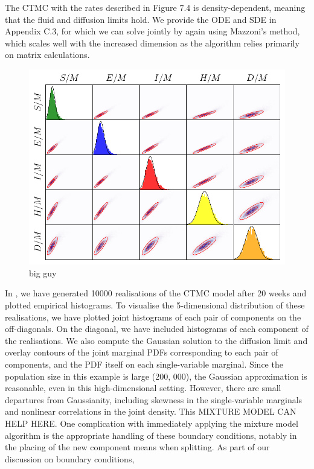 The CTMC with the rates described in Figure 7.4 is density-dependent, meaning that the fluid and diffusion limits hold. We provide the ODE and SDE in Appendix C.3, for which we can solve jointly by again using Mazzoni’s method, which scales well with the increased dimension as the algorithm relies primarily on matrix calculations.

\begin{landscape}
	\begin{figure}
		\centering
		\includegraphics[width=\textheight]{chp06_applications/figures/seihfr/seihfr_marginals_gaussian}
		\caption{big guy}
		\label{fig:ebola_marginals}
	\end{figure}
\end{landscape}


In , we have generated 10000 realisations of the CTMC model after 20 weeks and plotted empirical histograms.
To visualise the 5-dimensional distribution of these realisations, we have plotted joint histograms of each pair of components on the off-diagonals. On the diagonal, we have included histograms of each component of the realisations.
We also compute the Gaussian solution to the diffusion limit and overlay contours of the joint marginal PDFs corresponding to each pair of components, and the PDF itself on each single-variable marginal.
Since the population size in this example is large (200, 000), the Gaussian approximation is reasonable, even in this high-dimensional setting.
However, there are small departures from Gaussianity, including skewness in the single-variable marginals and nonlinear correlations in the joint density.
This MIXTURE MODEL CAN HELP HERE.
One complication with immediately applying the mixture model algorithm is the appropriate handling of these boundary conditions, notably in the placing of the new component means when splitting.
As part of our discussion on boundary conditions,

